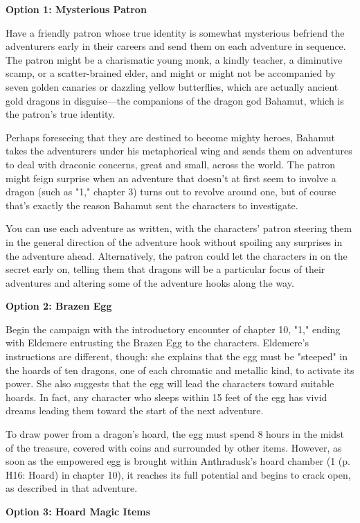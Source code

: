 \documentclass[letterpaper, 11pt, twocolumn]{dndbook}
\begin{document}
\textbf{Option 1: Mysterious Patron}

Have a friendly patron whose true identity is somewhat mysterious befriend the adventurers early in their careers and send them on each adventure in sequence. The patron might be a charismatic young monk, a kindly teacher, a diminutive scamp, or a scatter-brained elder, and might or might not be accompanied by seven golden canaries or dazzling yellow butterflies, which are actually ancient gold dragons in disguise---the companions of the dragon god Bahamut, which is the patron's true identity.

Perhaps foreseeing that they are destined to become mighty heroes, Bahamut takes the adventurers under his metaphorical wing and sends them on adventures to deal with draconic concerns, great and small, across the world. The patron might feign surprise when an adventure that doesn't at first seem to involve a dragon (such as "1," chapter 3) turns out to revolve around one, but of course that's exactly the reason Bahamut sent the characters to investigate.

You can use each adventure as written, with the characters' patron steering them in the general direction of the adventure hook without spoiling any surprises in the adventure ahead. Alternatively, the patron could let the characters in on the secret early on, telling them that dragons will be a particular focus of their adventures and altering some of the adventure hooks along the way.

\textbf{Option 2: Brazen Egg}

Begin the campaign with the introductory encounter of chapter 10, "1," ending with Eldemere entrusting the Brazen Egg to the characters. Eldemere's instructions are different, though: she explains that the egg must be "steeped" in the hoards of ten dragons, one of each chromatic and metallic kind, to activate its power. She also suggests that the egg will lead the characters toward suitable hoards. In fact, any character who sleeps within 15 feet of the egg has vivid dreams leading them toward the start of the next adventure.

To draw power from a dragon's hoard, the egg must spend 8 hours in the midst of the treasure, covered with coins and surrounded by other items. However, as soon as the empowered egg is brought within Anthradusk's hoard chamber (1 (p. H16: Hoard) in chapter 10), it reaches its full potential and begins to crack open, as described in that adventure.

\textbf{Option 3: Hoard Magic Items}
\end{document}

